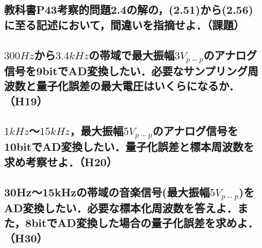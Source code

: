 \subsection{教科書P43考察的問題2.4の解の，(2.51)から(2.56)に至る記述において，間違いを指摘せよ．（課題）}
\vspace{7cm}

\newpage
\subsection{$300Hz$から$3.4kHz$の帯域で最大振幅$3V_{p-p}$のアナログ信号を9bitでAD変換したい．必要なサンプリング周波数と量子化誤差の最大電圧はいくらになるか．（H19）}
\vspace{7cm}

\subsection{$1kHz$〜$15kHz$，最大振幅$5V_{p-p}$のアナログ信号を10bitでAD変換したい．量子化誤差と標本周波数を求め考察せよ．（H20）}
\vspace{7cm}

\subsection{30Hz〜15kHzの帯域の音楽信号(最大振幅$5V_{p-p}$)をAD変換したい．必要な標本化周波数を答えよ．また，8bitでAD変換した場合の量子化誤差を求めよ．（H30）}


